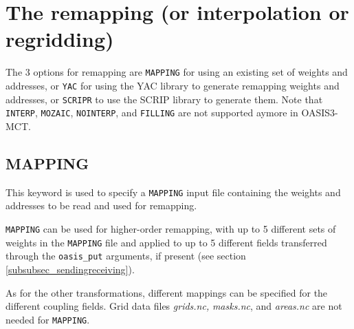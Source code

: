
\section{The remapping (or interpolation or regridding)}
\label{subsec_interp}

The  3 options for remapping are {\tt MAPPING} for using an existing set of weights and addresses, or {\tt YAC} for using the YAC library to generate remapping weights and addresses, or {\tt SCRIPR} to use the SCRIP library to generate them.
Note that {\tt INTERP}, {\tt MOZAIC}, {\tt NOINTERP}, and {\tt FILLING} are not supported aymore in OASIS3-MCT.

\subsection{MAPPING}
\label{subsec_mapping}

  This keyword is used to specify a {\tt MAPPING} input file containing the weights and addresses to be read and used for remapping.

{\tt MAPPING} can be used for higher-order remapping, with up to 5 different sets of weights in the {\tt MAPPING} file and applied to up to 5 different fields transferred through the {\tt oasis\_put} arguments, if present (see section \ref{subsubsec_sendingreceiving}).

As for the other transformations, different mappings can be specified for the different coupling fields. Grid data files {\it grids.nc,} {\it masks.nc}, and {\it areas.nc} are not needed for {\tt MAPPING}.

